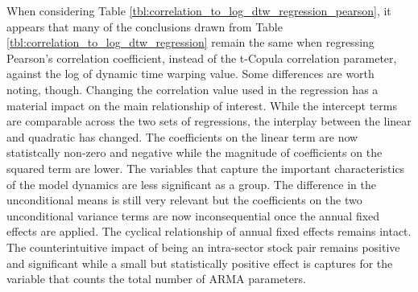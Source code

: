 When considering Table \ref{tbl:correlation_to_log_dtw_regression_pearson}, it appears that many of the conclusions drawn from Table \ref{tbl:correlation_to_log_dtw_regression} remain the same when regressing Pearson's correlation coefficient, instead of the t-Copula correlation parameter, against the log of dynamic time warping value. Some differences are worth noting, though. Changing the correlation value used in the regression has a material impact on the main relationship of interest. While the intercept terms are comparable across the two sets of regressions, the interplay between the linear and quadratic has changed. The coefficients on the linear term are now statistcally non-zero and negative while the magnitude of coefficients on the squared term are lower. The variables that capture the important characteristics of the model dynamics are less significant as a group. The difference in the unconditional means is still very relevant but the coefficients on the two unconditional variance terms are now inconsequential once the annual fixed effects are applied. The cyclical relationship of annual fixed effects remains intact. The counterintuitive impact of being an intra-sector stock pair remains positive and significant while a small but statistically positive effect is captures for the variable that counts the total number of ARMA parameters.

